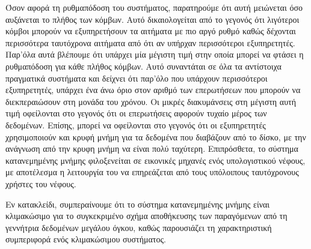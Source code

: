 Όσον αφορά τη ρυθμαπόδοση του συστήματος, παρατηρούμε ότι αυτή μειώνεται όσο αυξάνεται το πλήθος των κόμβων. Αυτό δικαιολογείται από το γεγονός ότι λιγότεροι κόμβοι 
μπορούν να \linebreak εξυπηρετήσουν τα αιτήματα με πιο αργό ρυθμό καθώς δέχονται περισσότερα ταυτόχρονα αιτήματα από ότι αν υπήρχαν περισσότεροι εξυπηρετητές. Παρ'όλα αυτά βλέπουμε 
ότι υπάρχει μία μέγιστη τιμή στην οποία μπορεί να φτάσει η ρυθμαπόδοση για κάθε πλήθος κόμβων. Αυτό συναντάται σε όλα τα αντίστοιχα πραγματικά συστήματα και δείχνει ότι 
παρ'όλο που υπάρχουν περισσότεροι εξυπηρετητές, υπάρχει ένα άνω όριο στον αριθμό των επερωτήσεων που μπορούν να διεκπεραιώσουν στη μονάδα του χρόνου. Οι 
μικρές διακυμάνσεις στη μέγιστη αυτή τιμή οφείλονται στο γεγονός ότι οι επερωτήσεις αφορούν τυχαίο μέρος των δεδομένων. Επίσης, μπορεί να οφείλονται στο γεγονός ότι 
οι εξυπηρετητές χρησιμοποιούν και κρυφή μνήμη για τα δεδομένα που διαβάζουν από το δίσκο, με την ανάγνωση από την κρυφη μνήμη να είναι πολύ ταχύτερη. Επιπρόσθετα, 
το σύστημα κατανεμημένης μνήμης φιλοξενείται σε εικονικές μηχανές ενός υπολογιστικού νέφους, με αποτέλεσμα η λειτουργία του να επηρεάζεται από τους 
υπόλοιπους ταυτόχρονους χρήστες του νέφους. 

Εν κατακλείδι, συμπεραίνουμε ότι το σύστημα κατανεμημένης μνήμης είναι κλιμακώσιμο για το συγκεκριμένο σχήμα αποθήκευσης των παραγόμενων 
από τη γεννήτρια δεδομένων μεγάλου όγκου, καθώς παρουσιάζει τη χαρακτηριστική συμπεριφορά ενός κλιμακώσιμου συστήματος. 

